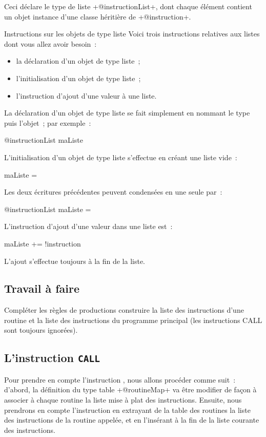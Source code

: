 Ceci déclare le type de liste \ggsq+@instructionList+, dont chaque élément contient un objet instance d'une classe héritière de \ggsq+@instruction+.

Instructions sur les objets de type liste
Voici trois instructions relatives aux listes dont vous allez avoir besoin~:
\begin{itemize}
  \item la déclaration d'un objet de type liste~;
  \item l'initialisation d'un objet de type liste~;
  \item l'instruction d'ajout d'une valeur à une liste.
\end{itemize}

La déclaration d'un objet de type liste se fait simplement en nommant le type puis l'objet~; par exemple~:
\begin{galgas4}
@instructionList maListe
\end{galgas4}

L'initialisation d'un objet de type liste s'effectue en créant une liste vide~:
\begin{galgas4}
maListe = {}
\end{galgas4}

Les deux écritures précédentes peuvent condensées en une seule par~:
\begin{galgas4}
@instructionList maListe = {}
\end{galgas4}

L'instruction d'ajout d'une valeur dans une liste est~:
\begin{galgas4}
maListe += !instruction
\end{galgas4}
L'ajout s'effectue toujours à la fin de la liste.

\subsection{Travail à faire}
Compléter les règles de productions construire la liste des instructions d'une routine et la liste des instructions du programme principal (les instructions CALL sont toujours ignorées).

\subsection{L'instruction \texttt{CALL}}
Pour prendre en compte l’instruction , nous allons procéder comme suit~: d’abord, la définition du type table \ggsq+@routineMap+ va être modifier de façon à associer à chaque routine la liste mise à plat des instructions. Ensuite, nous prendrons en compte l’instruction  en extrayant de la table des routines la liste des instructions de la routine appelée, et en l’insérant à la fin de la liste courante des instructions.

